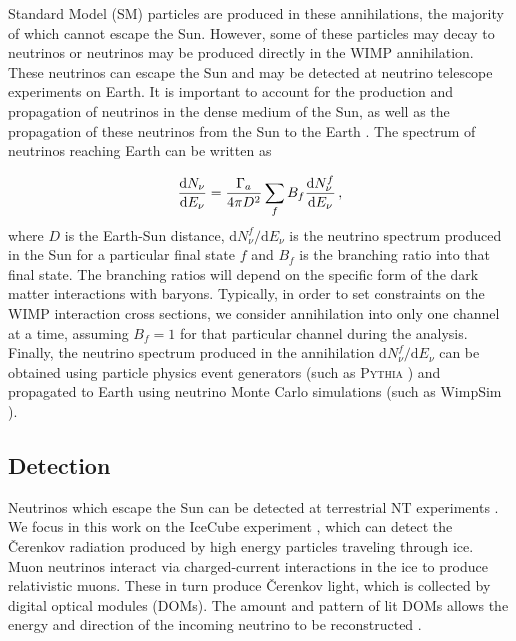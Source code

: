 Standard Model (SM) particles are produced in these annihilations, the majority of which cannot escape the Sun. However, some of these particles may decay to neutrinos or neutrinos may be produced directly in the WIMP annihilation. These neutrinos can escape the Sun and may be detected at neutrino telescope experiments on Earth. It is important to account for the production and propagation of neutrinos in the dense medium of the Sun, as well as the propagation of these neutrinos from the Sun to the Earth \cite{Blennow:2008}. The spectrum of neutrinos reaching Earth can be written as 

\begin{equation}
\frac{\mathrm{d}N_\nu}{\mathrm{d}E_\nu} = \frac{\Gamma_a}{4\pi D^2}\sum_f B_f \frac{\mathrm{d}N_\nu^f}{\mathrm{d}E_\nu}\,,
\end{equation}
where $D$ is the Earth-Sun distance, $\mathrm{d}N_\nu^f/\mathrm{d}E_\nu$ is the neutrino spectrum produced in the Sun for a particular final state $f$ and $B_f$ is the branching ratio into that final state. The branching ratios will depend on the specific form of the dark matter interactions with baryons. Typically, in order to set constraints on the WIMP interaction cross sections, we consider annihilation into only one channel at a time, assuming $B_f = 1$ for that particular channel during the analysis. Finally, the neutrino spectrum produced in the annihilation $\mathrm{d}N_\nu^f/\mathrm{d}E_\nu$ can be obtained using particle physics event generators (such as \textsc{Pythia} \cite{Sjostrand:1994}) and propagated to Earth using neutrino Monte Carlo simulations (such as WimpSim \cite{Blennow:2008}).



\subsection{Detection}

Neutrinos which escape the Sun can be detected at terrestrial NT experiments \cite{Adrian-Martinez:2013,Aartsen:2013b}. We focus in this work on the IceCube experiment \cite{Aartsen:2013b}, which can detect the \v{C}erenkov radiation produced by high energy particles traveling through ice. Muon neutrinos interact via charged-current interactions in the ice to produce relativistic muons. These in turn produce \v{C}erenkov light, which is collected by digital optical modules (DOMs). The amount and pattern of lit DOMs allows the energy and direction of the incoming neutrino to be reconstructed . 

